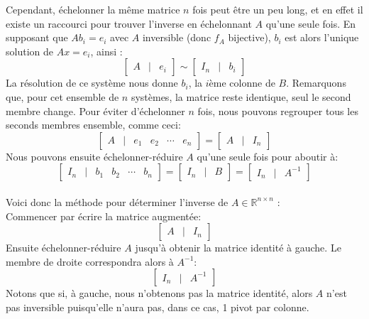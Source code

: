 \documentclass{article}
\newcommand{\R}{\mathbb{R}}
\newcommand{\cross}{\times}
\begin{document}
\noindent Cependant, échelonner la même matrice $n$ fois peut être un peu long, et en effet il existe un raccourci pour trouver l'inverse en échelonnant $A$ qu'une seule fois. En supposant que $Ab_i = e_i$ avec $A$ inversible (donc $f_A$ bijective), $b_i$ est alors l'unique solution de $Ax = e_i$, ainsi :
$$\begin{bmatrix} A & | & e_i\end{bmatrix} \sim \begin{bmatrix} I_n & | & b_i\end{bmatrix}$$
La résolution de ce système nous donne $b_i$, la $i$ème colonne de $B$. Remarquons que, pour cet ensemble de $n$ systèmes, la matrice reste identique, seul le second membre change. Pour éviter d'échelonner $n$ fois, nous pouvons regrouper tous les seconds membres ensemble, comme ceci:
$$\begin{bmatrix} A & | & e_1 & e_2 & \cdots & e_n\end{bmatrix} = \begin{bmatrix} A & | & I_n\end{bmatrix}$$
Nous pouvons ensuite échelonner-réduire $A$ qu'une seule fois pour aboutir à:
$$\begin{bmatrix} I_n & | & b_1 & b_2 & \cdots & b_n\end{bmatrix} = \begin{bmatrix} I_n & | & B \end{bmatrix} = \begin{bmatrix} I_n & | & A^{-1} \end{bmatrix}$$ \\

\noindent Voici donc la méthode pour déterminer l'inverse de $A \in \R^{n \cross n}$ :\\
Commencer par écrire la matrice augmentée:
$$\begin{bmatrix} A & | & I_n\end{bmatrix}$$
Ensuite échelonner-réduire $A$ jusqu'à obtenir la matrice identité à gauche. Le membre de droite correspondra alors à $A^{-1}$:
$$\begin{bmatrix} I_n & | & A^{-1}\end{bmatrix}$$
Notons que si, à gauche, nous n'obtenons pas la matrice identité, alors $A$ n'est pas inversible puisqu'elle n'aura pas, dans ce cas, 1 pivot par colonne.\\
\end{document}
